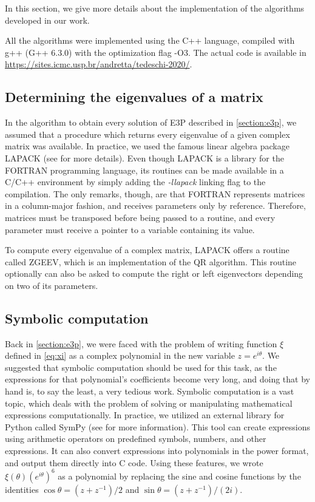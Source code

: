 In this section, we give more details about the implementation of the algorithms developed in our work.

All the algorithms were implemented using the C++ language, compiled with g++ (G++ 6.3.0) with the optimization flag -O3. The actual code is available in \url{https://sites.icmc.usp.br/andretta/tedeschi-2020/}.

\subsection{Determining the eigenvalues of a matrix}

In the algorithm to obtain every solution of E3P described in \autoref{section:e3p}, we assumed that a procedure which returns every eigenvalue of a given complex matrix was available. In practice, we used the famous linear algebra package LAPACK (see \cite{lapack} for more details).
Even though LAPACK is a library for the FORTRAN programming language, its routines can be made available in a C/C++ environment by simply adding the \textit{-llapack} linking flag to the compilation. The only remarks, though, are that FORTRAN represents matrices in a column-major fashion, and receives parameters only by reference. Therefore, matrices must be transposed before being passed to a routine, and every parameter must receive a pointer to a variable containing its value.

To compute every eigenvalue of a complex matrix, LAPACK offers a routine called ZGEEV, which is an implementation of the QR algorithm.
This routine optionally can also be asked to compute the right or left eigenvectors depending on two of its parameters. 


\subsection{Symbolic computation}


Back in \autoref{section:e3p}, we were faced with the problem of writing function $\xi$ defined in \autoref{eq:xi} as a complex polynomial in the new variable $z=e^{i\theta}$. We suggested that symbolic computation should be used for this task, as the expressions for that polynomial's coefficients become very long, and doing that by hand is, to say the least, a very tedious work.
Symbolic computation is a vast topic, which deals with the problem of solving or manipulating mathematical expressions computationally. 
In practice, we utilized an external library for Python called SymPy (see \cite{sympy} for more information).
This tool can create expressions using arithmetic operators on predefined symbols, numbers, and other expressions. It can also convert expressions into polynomials in the power format, and output them directly into C code. Using these features, we wrote $\xi(\theta)(e^{i\theta})^6$ as a polynomial by replacing the sine and cosine functions by the identities $\cos\theta=(z+z^{-1})/2$ and $\sin\theta=(z+z^{-1})/(2i)$.

